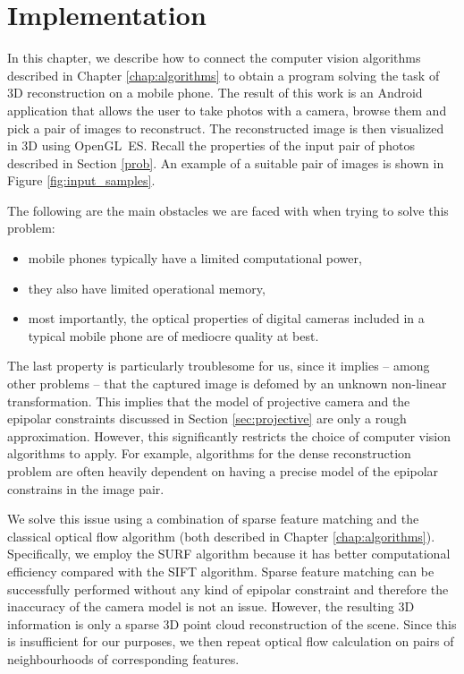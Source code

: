 \chapter{Implementation}
\label{chap:implementation}

In this chapter, we describe how to connect the computer vision algorithms described in Chapter \ref{chap:algorithms} to obtain a program solving the task of 3D reconstruction on a mobile phone. 
The result of this work is an Android application that allows the user to take photos with a camera, browse them and pick a pair of images to reconstruct. 
The reconstructed image is then visualized in 3D using OpenGL~ES.
Recall the properties of the input pair of photos described in Section \ref{prob}.
An example of a suitable pair of images is shown in Figure \ref{fig:input_samples}.

The following are the main obstacles we are faced with when trying to solve this problem: 
\begin{itemize}
\item mobile phones typically have a limited computational power, 
\item they also have limited operational memory, 
\item most importantly, the optical properties of digital cameras included in a typical mobile phone are of mediocre quality at best. 
\end{itemize} 
The last property is particularly troublesome for us, since it implies -- among other problems -- that the captured image is defomed by an unknown non-linear transformation. 
This implies that the model of projective camera and the epipolar constraints discussed in Section \ref{sec:projective} are only a rough approximation. 
However, this significantly restricts the choice of computer vision algorithms to apply. 
For example, algorithms for the dense reconstruction problem are often heavily dependent on having a precise model of the epipolar constrains in the image pair. 

We solve this issue using a combination of sparse feature matching and the classical optical flow algorithm (both described in Chapter \ref{chap:algorithms}). 
Specifically, we employ the SURF algorithm because it has better computational efficiency compared with the SIFT algorithm.
Sparse feature matching can be successfully performed without any kind of epipolar constraint and therefore the inaccuracy of the camera model is not an issue. 
However, the resulting 3D information is only a sparse 3D point cloud reconstruction of the scene. 
Since this is insufficient for our purposes, we then repeat optical flow calculation on pairs of neighbourhoods of corresponding features. 

